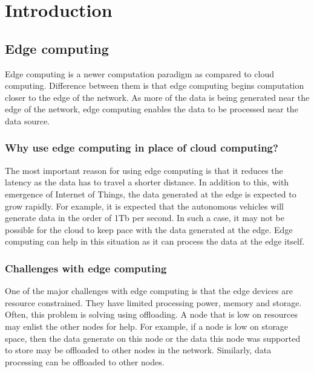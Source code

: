 
\chapter{Introduction}

\graphicspath{{Figs}}

\section{Edge computing}

Edge computing is a newer computation paradigm as compared to cloud computing.
Difference between them is that edge computing begins computation closer to the
edge of the network. As more of the data is being generated near the edge of the
network, edge computing enables the data to be processed near the data source.
\cite{weisongshiEdgeComputingVision2016}

\subsection{Why use edge computing in place of cloud computing?}

The most important reason for using edge computing is that it reduces the
latency as the data has to travel a shorter distance.
\cite{weisongshiEdgeComputingVision2016} In addition to this, with emergence of
Internet of Things, the data generated at the edge is expected to grow rapidly.
For example, it is expected that the autonomous vehicles will generate data in
the order of 1Tb per second. In such a case, it may not be possible for the
cloud to keep pace with the data generated at the edge. Edge computing can help
in this situation as it can process the data at the edge itself.

\subsection{Challenges with edge computing}

One of the major challenges with edge computing is that the edge devices are
resource constrained. They have limited processing power, memory and storage.
Often, this problem is solving using offloading. A node that is low on resources
may enlist the other nodes for help. For example, if a node is low on storage
space, then the data generate on this node or the data this node was supported
to store may be offloaded to other nodes in the network. Similarly, data
processing can be offloaded to other nodes.

